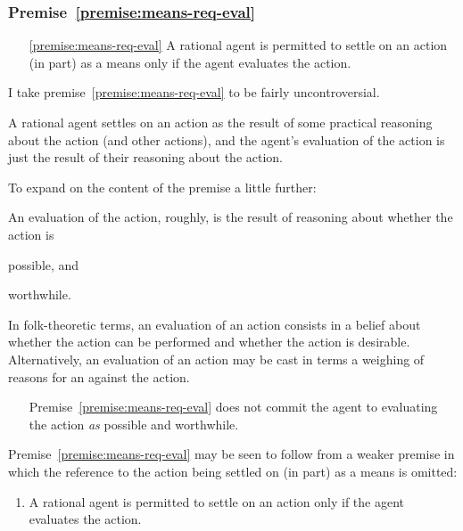 \documentclass[10pt]{article}
\newcommand{\hand}{\ding{43}}
\begin{document}
\newpage

\subsubsection{Premise~\ref{premise:means-req-eval}}


\begin{enumerate}
\item[\ref{premise:means-req-eval}] A rational agent is permitted to settle on an action (in part) as a means only if the agent evaluates the action.
\end{enumerate}

I take premise~\ref{premise:means-req-eval} to be fairly uncontroversial.

A rational agent settles on an action as the result of some practical reasoning about the action (and other actions), and the agent's evaluation of the action is just the result of their reasoning about the action.

To expand on the content of the premise a little further:

An evaluation of the action, roughly, is the result of reasoning about whether the action is
\begin{enumerate*}[label=\alph*)]
\item possible, and
\item worthwhile.
\end{enumerate*}

In folk-theoretic terms, an evaluation of an action consists in a belief about whether the action can be performed and whether the action is desirable.
Alternatively, an evaluation of an action may be cast in terms a weighing of reasons for an against the action.

\begin{itemize}
\item[\hand] Premise~\ref{premise:means-req-eval} does not commit the agent to evaluating the action \emph{as} possible and worthwhile.
\end{itemize}

Premise~\ref{premise:means-req-eval} may be seen to follow from a weaker premise in which the reference to the action being settled on (in part) as a means is omitted:
\begin{enumerate}
\item\label{premise:means-req-eval-weak} A rational agent is permitted to settle on an action only if the agent evaluates the action.
\end{enumerate}
\end{document}
